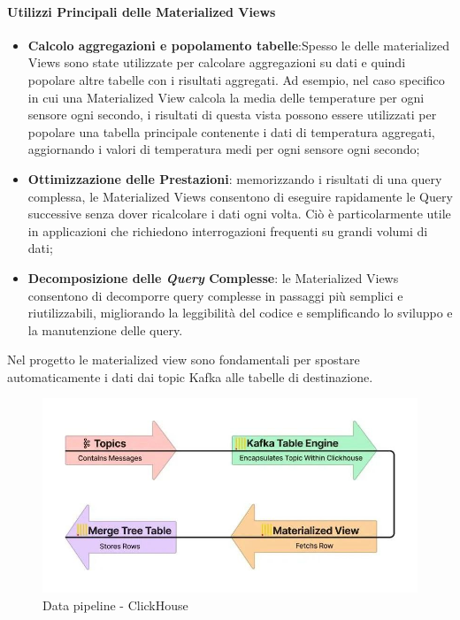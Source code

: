 \paragraph{Utilizzi Principali delle Materialized Views}
\begin{itemize}
    \item \textbf{Calcolo aggregazioni e popolamento tabelle}:Spesso le delle materialized Views sono state utilizzate per calcolare aggregazioni su dati e quindi popolare altre tabelle con i risultati aggregati. Ad esempio, nel caso specifico in cui una Materialized View calcola la media delle temperature per ogni sensore ogni secondo, i risultati di questa vista possono essere utilizzati per popolare una tabella principale contenente i dati di temperatura aggregati, aggiornando i valori di temperatura medi per ogni sensore ogni secondo;
    \item \textbf{Ottimizzazione delle Prestazioni}: memorizzando i risultati di una query complessa, le Materialized Views consentono di eseguire rapidamente le Query successive senza dover ricalcolare i dati ogni volta. Ciò è particolarmente utile in applicazioni che richiedono interrogazioni frequenti su grandi volumi di dati;
    \item \textbf{Decomposizione delle \textit{Query} Complesse}: le Materialized Views consentono di decomporre query complesse in passaggi più semplici e riutilizzabili, migliorando la leggibilità del codice e semplificando lo sviluppo e la manutenzione delle query.
\end{itemize}

Nel progetto le materialized view sono fondamentali per spostare automaticamente i dati dai topic Kafka alle tabelle di destinazione.
\begin{figure}[H]
  \centering
  \includegraphics[width=1\textwidth]{../Images/SpecificaTecnica/enginePipeline.jpg}
  \caption{Data pipeline - ClickHouse}
  \label{fig:datapip}
\end{figure}

